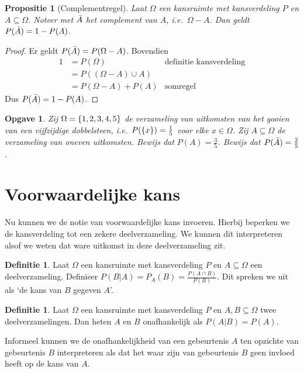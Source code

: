\documentclass[a4paper]{book}
\newtheorem{proposition}[theorem]{Propositie}
\newtheorem{exercise}[theorem]{Opgave}
\theoremstyle{definition}
\newtheorem{definition}[theorem]{Definitie}
\begin{document}
\begin{proposition}[Complementregel]\label{complementregel}
    Laat $\Omega$ een kansruimte met kansverdeling $P$ en $A \subseteq \Omega$.
    Noteer met $\compl{A}$ het complement van $A$, i.e.\ $\Omega - A$.
    Dan geldt $P(\compl{A}) = 1 - P(A)$.
\end{proposition}
\begin{proof}
    Er geldt $P(\compl{A}) = P(\Omega - A)$.
    Bovendien
    \begin{align*}
        1 &= P(\Omega) & \text{definitie kansverdeling}\\
          &= P( (\Omega - A) \cup A) \\
          &= P(\Omega - A) + P(A) & \text{somregel}
    \end{align*}
    Dus $P(\compl{A}) = 1 - P(A)$.
\end{proof}


\begin{exercise}
    Zij $\Omega = \set{1,2,3,4,5}$ de verzameling van uitkomsten van het gooien van een vijfzijdige dobbelsteen,
    i.e.\ $P(\set{x}) = \frac{1}{5}$ voor elke $x \in \Omega$.
    Zij $A \subseteq \Omega$ de verzameling van oneven uitkomsten.
    Bewijs dat $P(A) = \frac{3}{5}$.
    Bewijs dat $P(\compl{A}) = \frac{2}{5}$.
\end{exercise}


\section{Voorwaardelijke kans}
Nu kunnen we de notie van voorwaardelijke kans invoeren.
Hierbij beperken we de kansverdeling tot een zekere deelverzameling.
We kunnen dit interpreteren alsof we weten dat ware uitkomst in deze deelverzameling zit.
\begin{definition}
    Laat $\Omega$ een kansruimte met kansverdeling $P$ en $A \subseteq \Omega$ een deelverzameling.
    Definieer $P(B|A) = P_A(B) = \frac{P(A \cap B)}{P(B)}$. Dit spreken we uit als `de kans van $B$ gegeven $A$'.
\end{definition}

\begin{definition}
    Laat $\Omega$ een kansruimte met kansverdeling $P$ en $A,B \subseteq \Omega$ twee deelverzamelingen.
    Dan heten $A$ en $B$ onafhankelijk als $P(A|B) = P(A)$.
\end{definition}

Informeel kunnen we de onafhankelijkheid van een gebeurtenis $A$ ten opzichte van gebeurtenis $B$ interpreteren als dat het waar zijn van gebeurtenis $B$
geen invloed heeft op de kans van $A$.
\end{document}
